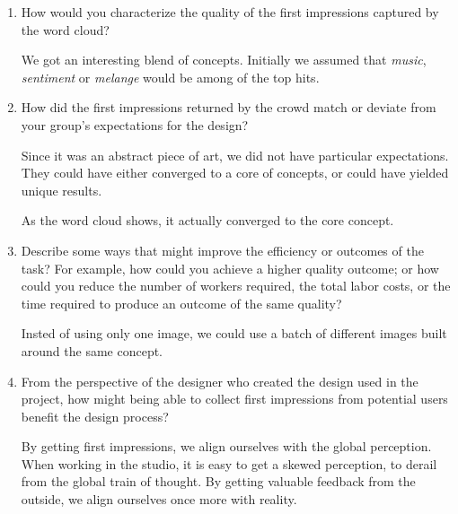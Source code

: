 \documentclass{article}
\begin{document}
\begin{enumerate}
\item How would you characterize the quality of the first impressions captured by the word cloud?

We got an interesting blend of concepts. Initially we assumed that \emph{music}, \emph{sentiment} or \emph{melange} would be among of the top hits.

\item How did the first impressions returned by the crowd match or deviate from your group's expectations for the design?

Since it was an abstract piece of art, we did not have particular expectations. They could have either converged to a core of concepts, or could have yielded unique results.

As the word cloud shows, it actually converged to the core concept.

\item Describe some ways that might improve the efficiency or outcomes of the task? For example, how could you achieve a higher quality outcome; or how could you reduce the number of workers required, the total labor costs, or the time required to produce an outcome of the same quality?

Insted of using only one image, we could use a batch of different images built around the same concept.

\item From the perspective of the designer who created the design used in the project, how might being able to collect first impressions from potential users benefit the design process?

By getting first impressions, we align ourselves with the global perception. When working in the studio, it is easy to get a skewed perception, to derail from the global train of thought. By getting valuable feedback from the outside, we align ourselves once more with reality.

\end{enumerate}
\end{document}
